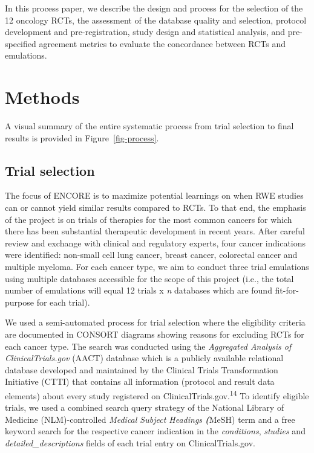 \documentclass[
  letterpaper,
  DIV=11,
  numbers=noendperiod]{scrartcl}
\begin{document}
In this process paper, we describe the design and process for the
selection of the 12 oncology RCTs, the assessment of the database
quality and selection, protocol development and pre-registration, study
design and statistical analysis, and pre-specified agreement metrics to
evaluate the concordance between RCTs and emulations.

\section{Methods}\label{methods}

A visual summary of the entire systematic process from trial selection
to final results is provided in Figure~\ref{fig-process}.

\subsection{Trial selection}\label{trial-selection}

The focus of ENCORE is to maximize potential learnings on when RWE
studies can or cannot yield similar results compared to RCTs. To that
end, the emphasis of the project is on trials of therapies for the most
common cancers for which there has been substantial therapeutic
development in recent years. After careful review and exchange with
clinical and regulatory experts, four cancer indications were
identified: non-small cell lung cancer, breast cancer, colorectal cancer
and multiple myeloma. For each cancer type, we aim to conduct three
trial emulations using multiple databases accessible for the scope of
this project (i.e., the total number of emulations will equal 12 trials
x \emph{n} databases which are found fit-for-purpose for each trial).

We used a semi-automated process for trial selection where the
eligibility criteria are documented in CONSORT diagrams showing reasons
for excluding RCTs for each cancer type. The search was conducted using
the \emph{Aggregated Analysis of ClinicalTrials.gov} (AACT) database
which is a publicly available relational database developed and
maintained by the Clinical Trials Transformation Initiative (CTTI) that
contains all information (protocol and result data elements) about every
study registered on ClinicalTrials.gov.\textsuperscript{14} To identify
eligible trials, we used a combined search query strategy of the
National Library of Medicine (NLM)-controlled \emph{Medical Subject
Headings \textbf{(}}MeSH) term and a free keyword search for the
respective cancer indication in the \emph{conditions}, \emph{studies}
and \emph{detailed\_descriptions} fields of each trial entry on
ClinicalTrials.gov.
\end{document}
